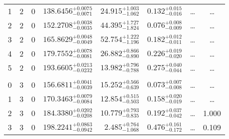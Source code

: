 \begin{table*}[!]
\begin{tabular}{llcrrlrc}
1 & 2 & 0 & $    138.6456_{-      0.0071}^{+      0.0075}$ & $      24.915_{-       1.062}^{+       1.003}$ & $       0.132_{-       0.016}^{+       0.015}$ & \multicolumn{1}{c}{\dots} & \dots \\[1pt]
2 & 2 & 0 & $    152.2708_{-      0.0035}^{+      0.0038}$ & $      44.395_{-       1.824}^{+       1.727}$ & $       0.076_{-       0.009}^{+       0.008}$ & \multicolumn{1}{c}{\dots} & \dots \\[1pt]
3 & 2 & 0 & $    165.8629_{-      0.0049}^{+      0.0048}$ & $      52.754_{-       1.196}^{+       1.222}$ & $       0.182_{-       0.011}^{+       0.012}$ & \multicolumn{1}{c}{\dots} & \dots \\[1pt]
4 & 2 & 0 & $    179.7552_{-      0.0081}^{+      0.0078}$ & $      26.882_{-       0.890}^{+       0.866}$ & $       0.226_{-       0.020}^{+       0.019}$ & \multicolumn{1}{c}{\dots} & \dots \\[1pt]
5 & 2 & 0 & $    193.6605_{-      0.0232}^{+      0.0213}$ & $      13.982_{-       0.788}^{+       0.796}$ & $       0.275_{-       0.044}^{+       0.040}$ & \multicolumn{1}{c}{\dots} & \dots \\[1pt]
\hline \\[-8pt]
0 & 3 & 0 & $    156.6811_{-      0.0039}^{+      0.0041}$ & $      15.252_{-       0.639}^{+       0.566}$ & $       0.073_{-       0.008}^{+       0.007}$ & \multicolumn{1}{c}{\dots} & \dots \\[1pt]
1 & 3 & 0 & $    170.3463_{-      0.0084}^{+      0.0079}$ & $      12.854_{-       0.503}^{+       0.515}$ & $       0.158_{-       0.019}^{+       0.020}$ & \multicolumn{1}{c}{\dots} & \dots \\[1pt]
2 & 3 & 0 & $    184.3380_{-      0.0208}^{+      0.0202}$ & $      10.779_{-       0.835}^{+       0.793}$ & $       0.192_{-       0.042}^{+       0.037}$ & \multicolumn{1}{c}{\dots} & 1.000\\[1pt]
3 & 3 & 0 & $    198.2241_{-      0.0942}^{+      0.0863}$ & $       2.485_{-       1.068}^{+       0.764}$ & $       0.476_{-       0.172}^{+       0.161}$ & \multicolumn{1}{c}{\dots} & 0.109\\[1pt]
\hline
\end{tabular}
\end{table*}